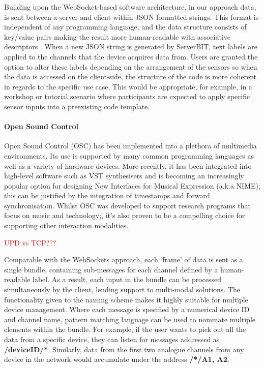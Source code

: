Building upon the WebSocket-based software architecture, in our approach data, is sent between a server and client within JSON formatted strings. This format is independent of any programming language, and the data structure consists of key/value pairs making the result more human-readable with associative descriptors \cite{marrs_json_2017}. When a new JSON string is generated by ServerBIT, text labels are applied to the channels that the device acquires data from. Users are granted the option to alter these labels depending on the arrangement of the sensors so when the data is accessed on the client-side, the structure of the code is more coherent in regards to the specific use case. This would be appropriate, for example, in a workshop or tutorial scenario where participants are expected to apply specific sensor inputs into a preexisting code template.

\paragraph{Open Sound Control}

Open Sound Control (OSC) has been implemented into a plethora of multimedia environments. Its use is supported by many common programming languages as well as a variety of hardware devices. More recently, it has been integrated into high-level software such as VST synthesisers and is becoming an increasingly popular option for designing New Interfaces for Musical Expression (a.k.a NIME); this can be justified by the integration of timestamps and forward synchronisation\cite{schmeder_best_2010}. Whilst OSC was developed to support research programs that focus on music and technology;\cite{freed_features_2009}, it’s also proven to be a compelling choice for supporting other interaction modalities.

\textcolor{red}{UPD vs TCP???}

Comparable with the WebSockets approach, each ‘frame’ of data is sent as a single bundle, containing sub-messages for each channel defined by a human-readable label. As a result, each input in the bundle can be processed simultaneously by the client, lending support to multi-modal solutions. The functionality given to the naming scheme makes it highly suitable for multiple device management. Where each message is specified by a numerical device ID and channel name, pattern matching language can be used to nominate multiple elements within the bundle. For example, if the user wants to pick out all the data from a specific device, they can listen for messages addressed as \textbf{/deviceID/*}. Similarly, data from the first two analogue channels from any device in the network would accumulate under the address \textbf{/*/{A1, A2}}.

